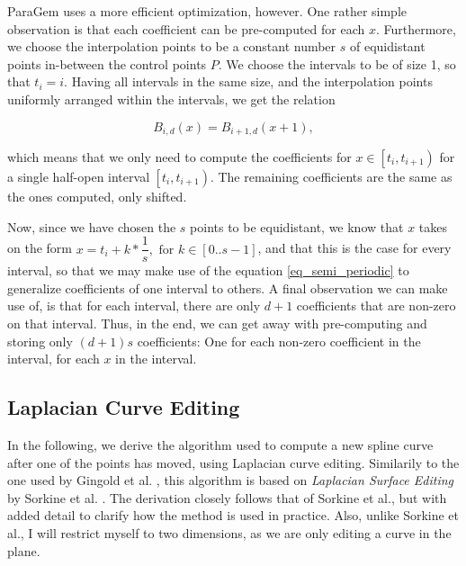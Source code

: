 \documentclass[english]{article}
\begin{document}
ParaGem uses a more efficient optimization, however. One rather simple observation is that each coefficient can be pre-computed for each $x$. Furthermore, we choose the interpolation points to be a constant number $s$ of equidistant points in-between the control points $P$. We choose the intervals to be of size 1, so that $t_i = i$. Having all intervals in the same size, and the interpolation points uniformly arranged within the intervals, we get the relation

\begin{equation} \label{eq_semi_periodic}
B_{i,d}(x) = B_{i + 1,d}(x + 1),
\end{equation}

which means that we only need to compute the coefficients for $x \in \left[t_i, t_{i + 1}\right)$ for a
  single half-open interval $\left[{t_i, t_{i + 1}}\right)$. The remaining coefficients are the same as the ones computed, only shifted.
    
    Now, since we have chosen the $s$ points to be equidistant, we know that $x$ takes on the form $x = t_i + k * \dfrac{1}{s}, \text{ for } k \in [0..{s-1}]$, and that this is the case for every interval, so that we may make use of the equation \ref{eq_semi_periodic} to generalize coefficients of one interval to others. A final observation we can make use of, is that for each interval, there are only $d + 1$ coefficients that are non-zero on that interval. Thus, in the end, we can get away with pre-computing and storing only $(d + 1)s$ coefficients: One for each non-zero coefficient in the interval, for each $x$ in the interval.
    

\subsection{Laplacian Curve Editing} \label{section_laplacian}

In the following, we derive the algorithm used to compute a new spline curve after one of the points has moved, using Laplacian curve editing. Similarily to the one used by Gingold et al. \cite{gingold09}, this algorithm is based on \textit{Laplacian Surface Editing} by Sorkine et al. \cite{sorkine04}. The derivation closely follows that of Sorkine et al., but with added detail to clarify how the method is used in practice. Also, unlike Sorkine et al., I will restrict myself to two dimensions, as we are only editing a curve in the plane.
\end{document}
